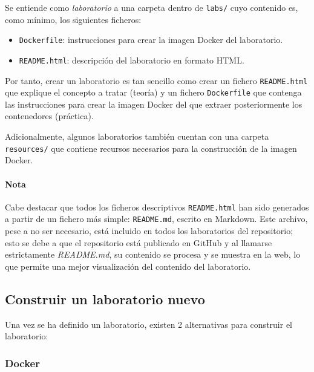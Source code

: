             Se entiende como \textit{laboratorio} a una carpeta dentro de \texttt{labs/} cuyo contenido es, como mínimo, los siguientes ficheros:
            
            \begin{itemize}
                \item \texttt{Dockerfile}: instrucciones para crear la imagen Docker del laboratorio.
                \item \texttt{README.html}: descripción del laboratorio en formato HTML.
            \end{itemize}

            Por tanto, crear un laboratorio es tan sencillo como crear un fichero \texttt{README.html} que explique el concepto a tratar (teoría) y un fichero \texttt{Dockerfile} que contenga las instrucciones para crear la imagen Docker del que extraer posteriormente los contenedores (práctica).

            Adicionalmente, algunos laboratorios también cuentan con una carpeta \texttt{resources/} que contiene recursos necesarios para la construcción de la imagen Docker.

            \paragraph{Nota}
                
                Cabe destacar que todos los ficheros descriptivos \texttt{README.html} han sido generados a partir de un fichero más simple: \texttt{README.md}, escrito en Markdown. Este archivo, pese a no ser necesario, está incluido en todos los laboratorios del repositorio; esto se debe a que el repositorio está publicado en GitHub y al llamarse estrictamente \textit{README.md}, su contenido se procesa y se muestra en la web, lo que permite una mejor visualización del contenido del laboratorio.

        \subsection{Construir un laboratorio nuevo}
            \label{sec:construir-laboratorio}

            Una vez se ha definido un laboratorio, existen 2 alternativas para construir el laboratorio:

            \subsubsection{Docker}

